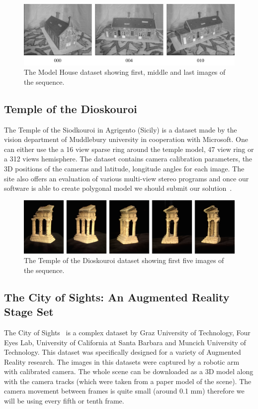 \begin{figure}[ht]
	\begin{center}
		\includegraphics[keepaspectratio,width=\textwidth]{fig/experiments-model-house.pdf}
	\end{center}
	\caption{The Model House dataset showing first, middle and last images of the sequence.}
	\label{fig:modelhouse}
\end{figure}

\subsection*{Temple of the Dioskouroi}
The Temple of the Siodkouroi in Agrigento (Sicily) is a dataset made by the vision department of Muddlebury university in cooperation with Microsoft. One can either use the a 16 view sparse ring around the temple model, 47 view ring or a 312 views hemisphere. The dataset contains camera calibration parameters, the 3D positions of the cameras and latitude, longitude angles for each image. The site also offers an evaluation of various multi-view stereo programs and once our software is able to create polygonal model we should submit our solution~\cite{dataset-temple}.

\begin{figure}[ht]
	\begin{center}
		\includegraphics[keepaspectratio,width=\textwidth]{fig/experiments-temple.pdf}
	\end{center}
	\caption{The Temple of the Dioskouroi dataset showing first five images of the sequence.}
	\label{fig:temple}
\end{figure}

\subsection*{The City of Sights: An Augmented Reality Stage Set}
The City of Sights~\cite{cityofsights_ISMAR2010} is a complex dataset by Graz University of Technology, Four Eyes Lab, University of California at Santa Barbara and Muncich University of Technology. This dataset was specifically designed for a variety of Augmented Reality research. The images in this datasets were captured by a robotic arm with calibrated camera. The whole scene can be downloaded as a 3D model along with the camera tracks (which were taken from a paper model of the scene). The camera movement between frames is quite small (around 0.1 mm) therefore we will be using every fifth or tenth frame.

